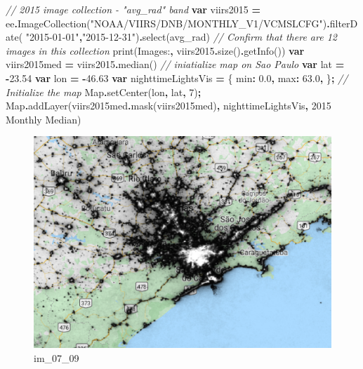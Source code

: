 \documentclass[
]{article}
\newenvironment{Shaded}{\begin{snugshade}}{\end{snugshade}}
\newcommand{\BuiltInTok}[1]{#1}
\newcommand{\CommentTok}[1]{\textcolor[rgb]{0.56,0.35,0.01}{\textit{#1}}}
\newcommand{\DataTypeTok}[1]{\textcolor[rgb]{0.13,0.29,0.53}{#1}}
\newcommand{\DecValTok}[1]{\textcolor[rgb]{0.00,0.00,0.81}{#1}}
\newcommand{\FloatTok}[1]{\textcolor[rgb]{0.00,0.00,0.81}{#1}}
\newcommand{\FunctionTok}[1]{\textcolor[rgb]{0.00,0.00,0.00}{#1}}
\newcommand{\KeywordTok}[1]{\textcolor[rgb]{0.13,0.29,0.53}{\textbf{#1}}}
\newcommand{\NormalTok}[1]{#1}
\newcommand{\OperatorTok}[1]{\textcolor[rgb]{0.81,0.36,0.00}{\textbf{#1}}}
\newcommand{\StringTok}[1]{\textcolor[rgb]{0.31,0.60,0.02}{#1}}
\begin{document}
\begin{Shaded}
\begin{Highlighting}[]
\CommentTok{// 2015 image collection {-} "avg\_rad" band}
\KeywordTok{var}\NormalTok{ viirs2015 }\OperatorTok{=}\NormalTok{ ee}\OperatorTok{.}\FunctionTok{ImageCollection}\NormalTok{(}\StringTok{"NOAA/VIIRS/DNB/MONTHLY\_V1/VCMSLCFG"}\NormalTok{)}\OperatorTok{.}\FunctionTok{filterDate}\NormalTok{(}
  \StringTok{"2015{-}01{-}01"}\OperatorTok{,}\StringTok{"2015{-}12{-}31"}\NormalTok{)}\OperatorTok{.}\FunctionTok{select}\NormalTok{(}\StringTok{\textquotesingle{}avg\_rad\textquotesingle{}}\NormalTok{)}
\CommentTok{// Confirm that there are 12 images in this collection }
\FunctionTok{print}\NormalTok{(}\StringTok{\textquotesingle{}Images:\textquotesingle{}}\OperatorTok{,}\NormalTok{ viirs2015}\OperatorTok{.}\FunctionTok{size}\NormalTok{()}\OperatorTok{.}\FunctionTok{getInfo}\NormalTok{())}
\KeywordTok{var}\NormalTok{ viirs2015med }\OperatorTok{=}\NormalTok{ viirs2015}\OperatorTok{.}\FunctionTok{median}\NormalTok{()}
\CommentTok{// iniatialize map on Sao Paulo}
\KeywordTok{var}\NormalTok{ lat }\OperatorTok{=} \OperatorTok{{-}}\FloatTok{23.54}
\KeywordTok{var}\NormalTok{ lon }\OperatorTok{=} \OperatorTok{{-}}\FloatTok{46.63}
\KeywordTok{var}\NormalTok{ nighttimeLightsVis }\OperatorTok{=}\NormalTok{ \{}
  \DataTypeTok{min}\OperatorTok{:} \FloatTok{0.0}\OperatorTok{,}
  \DataTypeTok{max}\OperatorTok{:} \FloatTok{63.0}\OperatorTok{,}
\NormalTok{\}}\OperatorTok{;}
\CommentTok{// Initialize the map}
\BuiltInTok{Map}\OperatorTok{.}\FunctionTok{setCenter}\NormalTok{(lon}\OperatorTok{,}\NormalTok{ lat}\OperatorTok{,} \DecValTok{7}\NormalTok{)}\OperatorTok{;}
\BuiltInTok{Map}\OperatorTok{.}\FunctionTok{addLayer}\NormalTok{(viirs2015med}\OperatorTok{.}\FunctionTok{mask}\NormalTok{(viirs2015med)}\OperatorTok{,}\NormalTok{ nighttimeLightsVis}\OperatorTok{,} \StringTok{\textquotesingle{}2015 Monthly Median\textquotesingle{}}\NormalTok{)}
\end{Highlighting}
\end{Shaded}

\begin{figure}
\centering
\includegraphics{./im/im_07_09.png}
\caption{im\_07\_09}
\end{figure}
\end{document}
